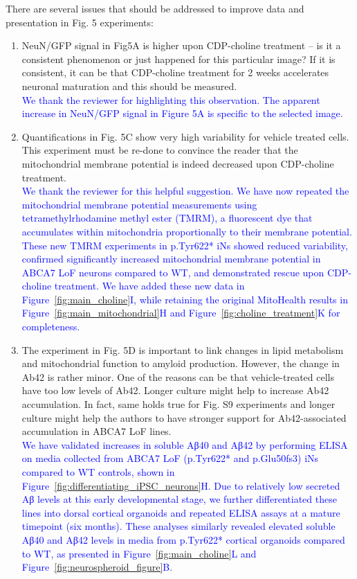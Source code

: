 There are several issues that should be addressed to improve data and presentation in Fig. 5 experiments:
\begin{enumerate}
	\item NeuN/GFP signal in Fig5A is higher upon CDP-choline treatment – is it a consistent phenomenon or just happened for this particular image? If it is consistent, it can be that CDP-choline treatment for 2 weeks accelerates neuronal maturation and this should be measured.\\
	\textcolor{blue}{We thank the reviewer for highlighting this observation. The apparent increase in NeuN/GFP signal in Figure 5A is specific to the selected image.}

	\item Quantifications in Fig. 5C show very high variability for vehicle treated cells. This experiment must be re-done to convince the reader that the mitochondrial membrane potential is indeed decreased upon CDP-choline treatment.\\
	\textcolor{blue}{We thank the reviewer for this helpful suggestion. We have now repeated the mitochondrial membrane potential measurements using tetramethylrhodamine methyl ester (TMRM), a fluorescent dye that accumulates within mitochondria proportionally to their membrane potential. These new TMRM experiments in p.Tyr622* iNs showed reduced variability, confirmed significantly increased mitochondrial membrane potential in ABCA7 LoF neurons compared to WT, and demonstrated rescue upon CDP-choline treatment. We have added these new data in Figure~\ref{fig:main_choline}I, while retaining the original MitoHealth results in Figure~\ref{fig:main_mitochondrial}H and Figure~\ref{fig:choline_treatment}K for completeness.}

	\item The experiment in Fig. 5D is important to link changes in lipid metabolism and mitochondrial function to amyloid production. However, the change in Ab42 is rather minor. One of the reasons can be that vehicle-treated cells have too low levels of Ab42. Longer culture might help to increase Ab42 accumulation. In fact, same holds true for Fig. S9 experiments and longer culture might help the authors to have stronger support for Ab42-associated accumulation in ABCA7 LoF lines.\\
	\textcolor{blue}{We have validated increases in soluble Aβ40 and Aβ42 by performing ELISA on media collected from ABCA7 LoF (p.Tyr622* and p.Glu50fs3) iNs compared to WT controls, shown in Figure~\ref{fig:differentiating_iPSC_neurons}H. Due to relatively low secreted Aβ levels at this early developmental stage, we further differentiated these lines into dorsal cortical organoids and repeated ELISA assays at a mature timepoint (six months). These analyses similarly revealed elevated soluble Aβ40 and Aβ42 levels in media from p.Tyr622* cortical organoids compared to WT, as presented in Figure~\ref{fig:main_choline}L and Figure~\ref{fig:neurospheroid_figure}B.}


\end{enumerate}
